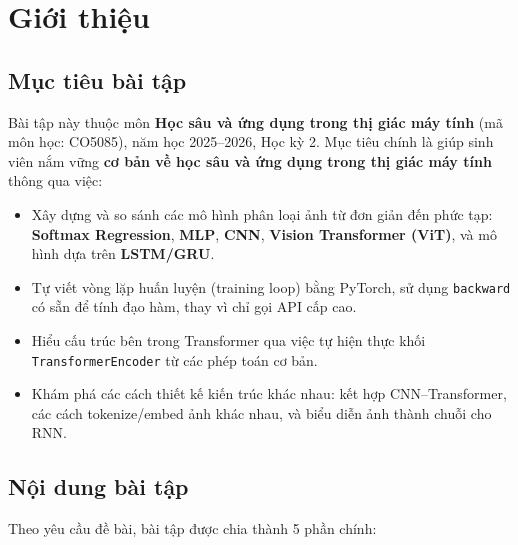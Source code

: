 \documentclass[a4paper]{article}
\newcommand{\code}[1]{\texttt{\textcolor{blue!80!black}{#1}}}
\theoremstyle{definition}
\begin{document}
\newpage
\tableofcontents
\newpage

\section{Giới thiệu}

\subsection{Mục tiêu bài tập}
Bài tập này thuộc môn \textbf{Học sâu và ứng dụng trong thị giác máy tính} (mã môn học: CO5085), năm học 2025--2026, Học kỳ 2. Mục tiêu chính là giúp sinh viên nắm vững \textbf{cơ bản về học sâu và ứng dụng trong thị giác máy tính} thông qua việc:

\begin{itemize}
	\item Xây dựng và so sánh các mô hình phân loại ảnh từ đơn giản đến phức tạp: \textbf{Softmax Regression}, \textbf{MLP}, \textbf{CNN}, \textbf{Vision Transformer (ViT)}, và mô hình dựa trên \textbf{LSTM/GRU}.
	\item Tự viết vòng lặp huấn luyện (training loop) bằng PyTorch, sử dụng \code{backward} có sẵn để tính đạo hàm, thay vì chỉ gọi API cấp cao.
	\item Hiểu cấu trúc bên trong Transformer qua việc tự hiện thực khối \code{TransformerEncoder} từ các phép toán cơ bản.
	\item Khám phá các cách thiết kế kiến trúc khác nhau: kết hợp CNN--Transformer, các cách tokenize/embed ảnh khác nhau, và biểu diễn ảnh thành chuỗi cho RNN.
\end{itemize}

\subsection{Nội dung bài tập}
Theo yêu cầu đề bài, bài tập được chia thành 5 phần chính:
\end{document}

